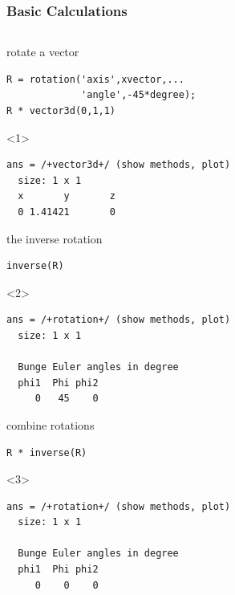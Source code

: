 \documentclass[compress]{beamer}
\begin{document}
\begin{frame}[fragile]
  \frametitle{Basic Calculations}

  \begin{columns}
    \begin{column}{8cm}

      \begin{overlayarea}{8cm}{8cm}
        rotate a vector
\begin{lstlisting}[style=input]
R = rotation('axis',xvector,...
             'angle',-45*degree);
R * vector3d(0,1,1)
\end{lstlisting}

\begin{onlyenv}<1>
  \vspace{-0.3cm}
\begin{lstlisting}[style=output]
ans = /+vector3d+/ (show methods, plot)
  size: 1 x 1
  x       y       z
  0 1.41421       0
  \end{lstlisting}
\end{onlyenv}

\pause
 \medskip

 the inverse rotation
 \begin{lstlisting}[style=input]
 inverse(R)
 \end{lstlisting}
 \begin{onlyenv}<2>
   \vspace{-0.3cm}
  \begin{lstlisting}[style=output]
ans = /+rotation+/ (show methods, plot)
  size: 1 x 1

  Bunge Euler angles in degree
  phi1  Phi phi2
     0   45    0
  \end{lstlisting}
 \end{onlyenv}

 \pause
 \medskip

 combine rotations
 \begin{lstlisting}[style=input]
R * inverse(R)
\end{lstlisting}

\begin{onlyenv}<3>
  \vspace{-0.3cm}
  \begin{lstlisting}[style=output]
ans = /+rotation+/ (show methods, plot)
  size: 1 x 1

  Bunge Euler angles in degree
  phi1  Phi phi2
     0    0    0
  \end{lstlisting}
\end{onlyenv}

\pause
\medskip


\end{overlayarea}
\end{column}
\end{columns}
\end{frame}
\end{document}
